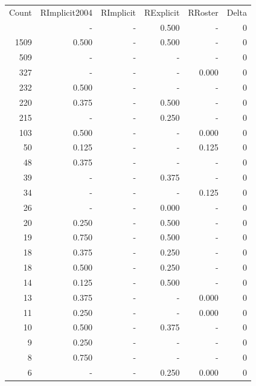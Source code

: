 \documentclass[a4paper]{article}\usepackage{graphicx, color}
\begin{document}
\begin{table}[ht]
\centering
\begin{tabular}{rrrrrr}
  \hline
Count & RImplicit2004 & RImplicit & RExplicit & RRoster & Delta \\ 
  \rowcolor{sosoColor}  \hline
1797 & - & - & 0.500 & - & 0 \\ 
   \rowcolor{sosoColor} 1509 & 0.500 & - & 0.500 & - & 0 \\ 
   \rowcolor{nullColor} 509 & - & - & - & - & 0 \\ 
   \rowcolor{nullColor} 327 & - & - & - & 0.000 & 0 \\ 
   \rowcolor{nullColor} 232 & 0.500 & - & - & - & 0 \\ 
   \rowcolor{sosoColor} 220 & 0.375 & - & 0.500 & - & 0 \\ 
   \rowcolor{sosoColor} 215 & - & - & 0.250 & - & 0 \\ 
   \rowcolor{nullColor} 103 & 0.500 & - & - & 0.000 & 0 \\ 
   \rowcolor{nullColor} 50 & 0.125 & - & - & 0.125 & 0 \\ 
   \rowcolor{nullColor} 48 & 0.375 & - & - & - & 0 \\ 
   \rowcolor{sosoColor} 39 & - & - & 0.375 & - & 0 \\ 
   \rowcolor{nullColor} 34 & - & - & - & 0.125 & 0 \\ 
   \rowcolor{sosoColor} 26 & - & - & 0.000 & - & 0 \\ 
   \rowcolor{sosoColor} 20 & 0.250 & - & 0.500 & - & 0 \\ 
   \rowcolor{sosoColor} 19 & 0.750 & - & 0.500 & - & 0 \\ 
   \rowcolor{sosoColor} 18 & 0.375 & - & 0.250 & - & 0 \\ 
   \rowcolor{sosoColor} 18 & 0.500 & - & 0.250 & - & 0 \\ 
   \rowcolor{sosoColor} 14 & 0.125 & - & 0.500 & - & 0 \\ 
   \rowcolor{nullColor} 13 & 0.375 & - & - & 0.000 & 0 \\ 
   \rowcolor{nullColor} 11 & 0.250 & - & - & 0.000 & 0 \\ 
   \rowcolor{sosoColor} 10 & 0.500 & - & 0.375 & - & 0 \\ 
   \rowcolor{nullColor} 9 & 0.250 & - & - & - & 0 \\ 
   \rowcolor{nullColor} 8 & 0.750 & - & - & - & 0 \\ 
   \rowcolor{sosoColor} 6 & - & - & 0.250 & 0.000 & 0 \\ 

\end{tabular}
\end{table}
\end{document}
